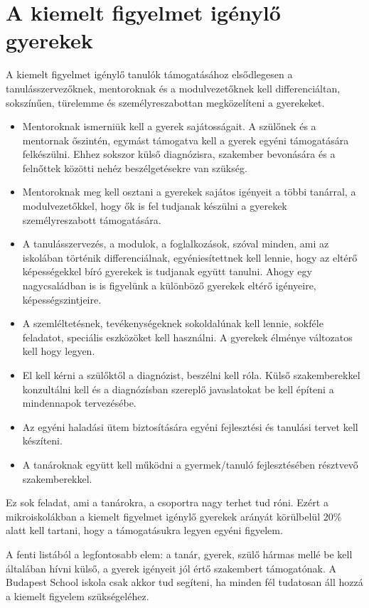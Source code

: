 \section{A kiemelt figyelmet igénylő gyerekek}\label{sec:kiemelt_figyelem}

A kiemelt figyelmet igénylő tanulók támogatásához  elsődlegesen a tanulásszervezőknek, mentoroknak és a modulvezetőknek kell differenciáltan, sokszínűen, türelemme és személyreszabottan megközelíteni a gyerekeket.

\begin{itemize}
      \item Mentoroknak ismerniük kell a gyerek sajátosságait. A szülőnek és a mentornak őszintén, egymást támogatva kell a gyerek egyéni támogatására felkészülni. Ehhez sokszor külső diagnózisra, szakember bevonására és a felnőttek közötti nehéz beszélgetésekre van szükség.
      \item Mentoroknak meg kell osztani a gyerekek sajátos igényeit a többi tanárral, a modulvezetőkkel, hogy ők is fel tudjanak készülni a gyerekek személyreszabott támogatására.
      \item A tanulásszervezés, a modulok, a foglalkozások, szóval minden, ami az iskolában történik  differenciálnak, egyéniesítettnek kell lennie, hogy az eltérő képességekkel bíró gyerekek is tudjanak együtt tanulni. Ahogy egy nagycsaládban is is figyelünk a különböző gyerekek eltérő igényeire, képességszintjeire.
      \item A szemléltetésnek, tevékenységeknek sokoldalúnak kell lennie, sokféle feladatot, speciális eszközöket kell használni. A gyerekek élménye változatos kell hogy legyen.
      \item El kell kérni a szülőktől a diagnózist, beszélni kell róla. Külső szakemberekkel konzultálni kell és a diagnózísban szereplő javaslatokat be kell építeni a mindennapok tervezésébe.
      \item Az egyéni haladási ütem biztosítására egyéni fejlesztési és tanulási tervet kell készíteni.
      \item A tanároknak együtt kell működni a gyermek/tanuló fejlesztésében résztvevő szakemberekkel.
\end{itemize}

Ez sok feladat, ami a tanárokra, a csoportra nagy terhet tud róni. Ezért a mikroiskolákban a kiemelt figyelmet igénylő gyerekek arányát körülbelül 20\% alatt kell tartani, hogy a támogatásukra legyen egyéni figyelem.

A fenti listából a legfontosabb elem: a tanár, gyerek, szülő hármas mellé be kell általában hívni külső, a gyerek igényeit jól értő szakembert támogatónak. A Budapest School iskola csak akkor tud segíteni, ha minden fél tudatosan áll hozzá a kiemelt figyelem szükségeléhez.
